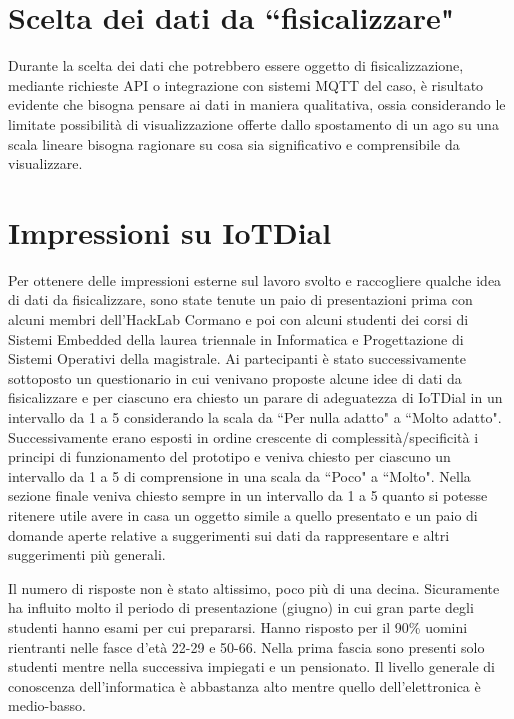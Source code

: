 \documentclass[12pt,a4paper]{report}
\begin{document}
\section{Scelta dei dati da ``fisicalizzare"}
Durante la scelta dei dati che potrebbero essere oggetto di fisicalizzazione, mediante richieste API o integrazione con sistemi MQTT
del caso, è risultato evidente che bisogna pensare ai dati in maniera qualitativa, ossia considerando le limitate possibilità di visualizzazione
offerte dallo spostamento di un ago su una scala lineare bisogna ragionare su cosa sia significativo e comprensibile da visualizzare.

\section{Impressioni su IoTDial} %
Per ottenere delle impressioni esterne sul lavoro svolto e raccogliere qualche idea di dati da fisicalizzare, sono state tenute un paio di
presentazioni prima con alcuni membri dell'HackLab Cormano e poi con alcuni studenti dei corsi di Sistemi Embedded della laurea triennale
in Informatica e Progettazione di Sistemi Operativi della magistrale.
Ai partecipanti è stato successivamente sottoposto un questionario in cui venivano proposte alcune idee di dati da fisicalizzare e per ciascuno
era chiesto un parare di adeguatezza di IoTDial in un intervallo da 1 a 5 considerando la scala da ``Per nulla adatto" a ``Molto adatto".
Successivamente erano esposti in ordine crescente di complessità/specificità i principi di funzionamento del prototipo e veniva chiesto per
ciascuno un intervallo da 1 a 5 di comprensione in una scala da ``Poco" a ``Molto".
Nella sezione finale veniva chiesto sempre in un intervallo da 1 a 5 quanto si potesse ritenere utile avere in casa un oggetto simile a quello
presentato e un paio di domande aperte relative a suggerimenti sui dati da rappresentare e altri suggerimenti più generali.

Il numero di risposte non è stato altissimo,  poco più di una decina.
Sicuramente ha influito molto il periodo di presentazione (giugno) in cui gran parte degli studenti hanno esami per cui prepararsi.
Hanno risposto per il 90\% uomini rientranti nelle fasce d'età 22-29 e 50-66. Nella prima fascia sono presenti solo studenti mentre nella
successiva impiegati e un pensionato.
Il livello generale di conoscenza dell'informatica è abbastanza alto mentre quello dell'elettronica è medio-basso.
\end{document}
